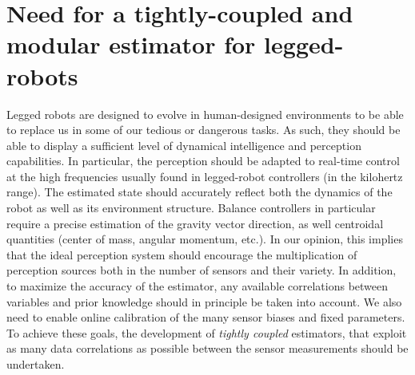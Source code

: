 





\section{Need for a tightly-coupled and modular estimator for legged-robots}

Legged robots are designed to evolve in human-designed environments to be able to replace us in some of our tedious or dangerous tasks. As such, they should be able to
display a sufficient level of dynamical intelligence and perception capabilities. 
In particular, the perception should be adapted to real-time control at the high frequencies usually found in legged-robot controllers (in the kilohertz range).
The estimated state should accurately reflect both the dynamics of the robot as well as its environment structure. Balance controllers in particular require a precise estimation of the gravity vector direction, as well centroidal quantities (center of mass, angular momentum, etc.).
In our opinion, this implies that the ideal perception system should encourage the multiplication of perception sources both in the number of sensors and their variety.
In addition, to maximize the accuracy of the estimator, any available correlations between variables and prior knowledge should in principle be taken into account. 
We also need to enable online calibration of the many sensor biases and fixed parameters. To achieve these goals, the development of \textit{tightly coupled} estimators, 
that exploit as many data correlations as possible between the sensor measurements should be undertaken.

